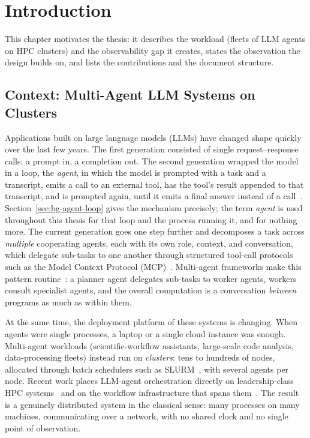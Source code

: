 \chapter{Introduction}
\label{chap:intro}

This chapter motivates the thesis: it describes the workload (fleets
of LLM agents on HPC clusters) and the observability gap it creates,
states the observation the design builds on, and lists the
contributions and the document structure.

\section{Context: Multi-Agent LLM Systems on Clusters}
\label{sec:intro-context}

Applications built on large language models (LLMs) have changed shape
quickly over the last few years. The first generation consisted of single
request--response calls: a prompt in, a completion out. The second generation
wrapped the model in a loop, the \emph{agent}, in which the model is
prompted with a task and a transcript, emits a call to an external tool,
has the tool's result appended to that transcript, and is prompted again,
until it emits a final answer instead of a call~\cite{yao2023react}.
Section~\ref{sec:bg-agent-loop} gives the mechanism precisely; the term
\emph{agent} is used throughout this thesis for that loop and the process
running it, and for nothing more. The current generation
goes one step further and decomposes a task across \emph{multiple}
cooperating agents, each with its own role, context, and
conversation, which delegate sub-tasks to one another through structured
tool-call protocols such as the Model Context Protocol
(MCP)~\cite{anthropic2024mcp}. Multi-agent frameworks make this pattern
routine~\cite{wu2023autogen}: a planner agent delegates sub-tasks to worker
agents, workers consult specialist agents, and the overall computation is a
conversation \emph{between} programs as much as within them.

At the same time, the deployment platform of these systems is changing.
When agents were single processes, a laptop or a single cloud instance was
enough. Multi-agent workloads (scientific-workflow assistants, large-scale
code analysis, data-processing fleets) instead run on
\emph{clusters}: tens to hundreds of nodes, allocated through batch schedulers
such as SLURM~\cite{yoo2003slurm}, with several agents per node. Recent
work places LLM-agent orchestration directly on leadership-class HPC
systems~\cite{pham2026multiagenthpc} and on the workflow infrastructure
that spans them~\cite{souza2025provenance}. The result
is a genuinely distributed system in the classical sense: many processes on
many machines, communicating over a network, with no shared clock and no
single point of observation.

